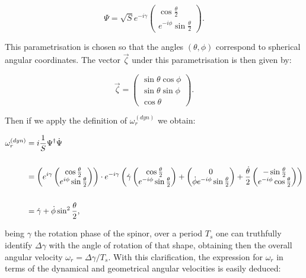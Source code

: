 \begin{equation*}
\Psi = \sqrt{S}e^{-i\gamma} \begin{pmatrix}\cos{\frac{\theta}{2}}\\
e^{-i\phi}\sin{\frac{\theta}{2}}\end{pmatrix}.
\end{equation*}

This parametrisation is chosen so that the angles $(\theta,\phi)$ correspond to spherical angular coordinates. The vector $\vec{\zeta}$ under this parametrisation is then given by:

\begin{equation*}
\vec{\zeta} = \begin{pmatrix} \sin{\theta}\cos{\phi}\\ \sin{\theta}\sin{\phi}\\ \cos{\theta} \end{pmatrix}.
\end{equation*}

Then if we apply the definition of $\omega_r^{(dyn)}$ we obtain:

\begin{align*}
\omega_r^{(dyn)} &= i\frac{1}{S}\Psi^\dagger\dot{\Psi} \\
\\
&= \left( e^{i\gamma}\begin{pmatrix}\cos{\frac{\theta}{2}} \\e^{i\phi}\sin{\frac{\theta}{2}}\end{pmatrix} \right)\cdot e^{-i\gamma}\left( \dot{\gamma}\begin{pmatrix}\cos{\frac{\theta}{2}} \\e^{-i\phi}\sin{\frac{\theta}{2}}\end{pmatrix}+ \begin{pmatrix}0 \\ \dot{\phi}e^{-i\phi}\sin{\frac{\theta}{2}}\end{pmatrix} + \frac{\dot{\theta}}{2}\begin{pmatrix}-\sin{\frac{\theta}{2}} \\e^{-i\phi}\cos{\frac{\theta}{2}}\end{pmatrix} \right)\\
\\
&= \dot{\gamma}+\dot{\phi}\sin^2{\frac{\theta}{2}},
\end{align*}

being $\gamma$ the rotation phase of the spinor, over a period $T_s$ one can truthfully identify $\Delta \gamma$ with the angle of rotation of that shape, obtaining then the overall angular velocity $\omega_r = \Delta \gamma /T_s$. With this clarification, the expression for $\omega_r$ in terms of the dynamical and geometrical angular velocities is easily deduced:

